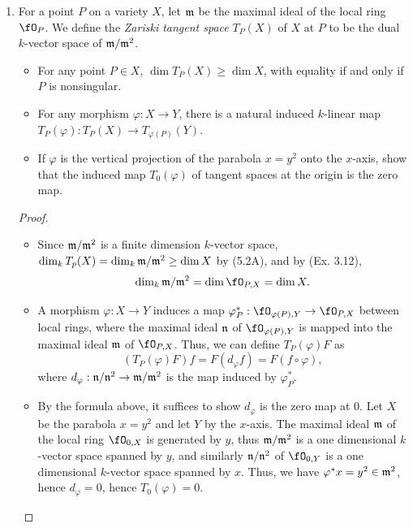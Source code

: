 \documentclass[a4paper]{article}
\begin{document}
\begin{enumerate} [label=\textbf{\arabic*.}, leftmargin=0cm]
    \item[\textbf{10.}] For a point $P$ on a variety $X$, let $\mathfrak{m}$ be the maximal ideal of the local ring $\fO_P$. We define the \textit{Zariski tangent space} $T_P(X)$ of $X$ at $P$ to be the dual $k$-vector space of $\mathfrak{m} / \mathfrak{m}^2$.
          \begin{itemize}
              \item[(a)] For any point $P \in X$, $\dim{T_P(X)} \geq \dim{X}$, with equality if and only if $P$ is nonsingular.
              \item[(b)] For any morphism $\varphi : X \to Y$, there is a natural induced $k$-linear map $T_P(\varphi) : T_P(X) \to T_{\varphi(P)}(Y)$.
              \item[(c)] If $\varphi$ is the vertical projection of the parabola $x = y^2$ onto the $x$-axis, show that the induced map $T_0(\varphi)$ of tangent spaces at the origin is the zero map.
          \end{itemize}

          \begin{proof} $ $ \vspace{0pt}
              \begin{itemize} [leftmargin=0cm]
                  \item[(a)] Since $\mathfrak{m} / \mathfrak{m}^2$ is a finite dimension $k$-vector space, $\dim_k{T_p(X)} = \dim_k{\mathfrak{m} / \mathfrak{m}^2} \geq \dim{X}$ by (5.2A), and by (Ex. 3.12), $$\dim_k{\goth{m} / \goth{m}^2} = \dim{\fO_{P, X}} = \dim{X}.$$

                  \item[(b)] A morphism $\varphi : X \to Y$ induces a map $\varphi_{P}^* : \fO_{\varphi(P), Y} \to \fO_{P, X}$ between local rings, where the maximal ideal $\mathfrak{n}$ of $\fO_{\varphi(P), Y}$ is mapped into the maximal ideal $\mathfrak{m}$ of $\fO_{P, X}$. Thus, we can define $T_P(\varphi)F$ as
                        \begin{equation*}
                            (T_P(\varphi)F)f = F(d_\varphi f) = F(f \circ \varphi),
                        \end{equation*}
                        where $d_\varphi : \mathfrak{n} / \mathfrak{n}^2 \to \mathfrak{m} / \mathfrak{m}^2$ is the map induced by $\varphi_P^*$.

                  \item[(c)] By the formula above, it suffices to show $d_\varphi$ is the zero map at $0$. Let $X$ be the parabola $x = y^2$ and let $Y$ by the $x$-axis.
                  The maximal ideal $\mathfrak{m}$ of the local ring $\fO_{0, X}$ is generated by $y$, thus $\mathfrak{m} / \mathfrak{m}^2$ is a one dimensional $k$-vector space spanned by $y$, and similarly $\mathfrak{n} / \mathfrak{n}^2$ of $\fO_{0, Y}$ is a one dimensional $k$-vector space spanned by $x$. Thus, we have $\varphi^* x = y^2 \in \mathfrak{m}^2$, hence $d_\varphi = 0$, hence $T_0(\varphi) = 0$.
              \end{itemize}
          \end{proof}

\end{enumerate}
\end{document}
